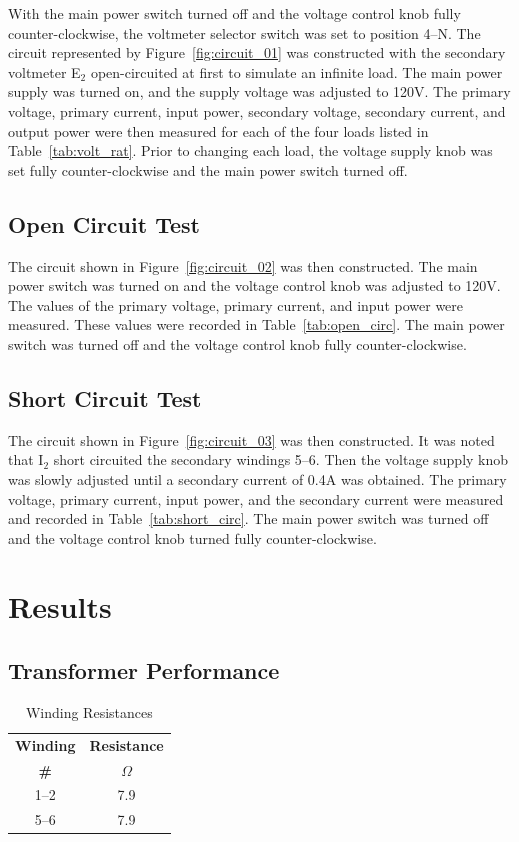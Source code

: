 \documentclass{article}
\begin{document}
\label{part1} With the main power switch turned off and the voltage control
knob fully counter-clockwise, the voltmeter selector switch was set to position
4--N. The circuit represented by Figure~\ref{fig:circuit_01} was constructed
with the secondary voltmeter E$_2$ open-circuited at first to simulate an
infinite load.  The main power supply was turned on, and the supply voltage was
adjusted to 120V. The primary voltage, primary current, input power, secondary
voltage, secondary current, and output power were then measured for each of the
four loads listed in Table~\ref{tab:volt_rat}.  Prior to changing each load,
the voltage supply knob was set fully counter-clockwise and the main power
switch turned off.

\subsection{Open Circuit Test}

\label{part2} The circuit shown in Figure~\ref{fig:circuit_02} was then
constructed. The main power switch was turned on and the voltage control knob
was adjusted to 120V. The values of the primary voltage, primary current, and
input power were measured. These values were recorded in
Table~\ref{tab:open_circ}.  The main power switch was turned off and the
voltage control knob fully counter-clockwise.

\subsection{Short Circuit Test}

\label{part3} The circuit shown in Figure~\ref{fig:circuit_03} was then
constructed. It was noted that I$_2$ short circuited the secondary windings
5--6. Then the voltage supply knob was slowly adjusted until a secondary
current of 0.4A was obtained. The primary voltage, primary current, input
power, and the secondary current were measured and recorded in
Table~\ref{tab:short_circ}.  The main power switch was turned off and the
voltage control knob turned fully counter-clockwise.

\section{Results}
\subsection{Transformer Performance}
\begin{table}[H]
  \centering
  \begin{tabular}{*{2}{c}}
    \textbf{Winding} & \textbf{Resistance} \\
    \textbf{\#} & $\Omega$ \\
    \hline
    1--2 &  7.9 \\
    5--6 &  7.9 \\
  \end{tabular}
  \caption{Winding Resistances}
  \label{tab:wind_res}
\end{table}
\end{document}
